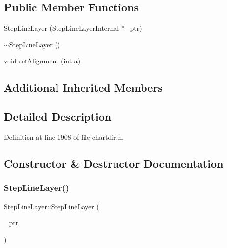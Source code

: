 \subsection*{Public Member Functions}
\begin{DoxyCompactItemize}
\item 
\hyperlink{class_step_line_layer_a24bff754f77f0d6b7b5c1c7845bf1e4a}{Step\+Line\+Layer} (Step\+Line\+Layer\+Internal $\ast$\+\_\+ptr)
\item 
\hyperlink{class_step_line_layer_a9bd122f19f51a1b8736be3b1557b6eba}{$\sim$\+Step\+Line\+Layer} ()
\item 
void \hyperlink{class_step_line_layer_afe0552f1c6e760ddf99d492e80163039}{set\+Alignment} (int a)
\end{DoxyCompactItemize}
\subsection*{Additional Inherited Members}


\subsection{Detailed Description}


Definition at line 1908 of file chartdir.\+h.



\subsection{Constructor \& Destructor Documentation}
\mbox{\label{class_step_line_layer_a24bff754f77f0d6b7b5c1c7845bf1e4a}} 
\subsubsection{\texorpdfstring{Step\+Line\+Layer()}{StepLineLayer()}}
{\footnotesize\ttfamily Step\+Line\+Layer\+::\+Step\+Line\+Layer (\begin{DoxyParamCaption}\item[{Step\+Line\+Layer\+Internal $\ast$}]{\+\_\+ptr }\end{DoxyParamCaption})\hspace{0.3cm}{\ttfamily [inline]}}



